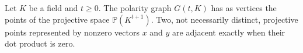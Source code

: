 \begin{definition}
Let \(K\) be a field and \(t\ge 0\). The polarity graph \(G(t,K)\) has as vertices the points of the projective space \(\mathbb P(K^{t+1})\). Two, not necessarily distinct, projective points represented by nonzero vectors \(x\) and \(y\) are adjacent exactly when their dot product is zero.
\end{definition}
